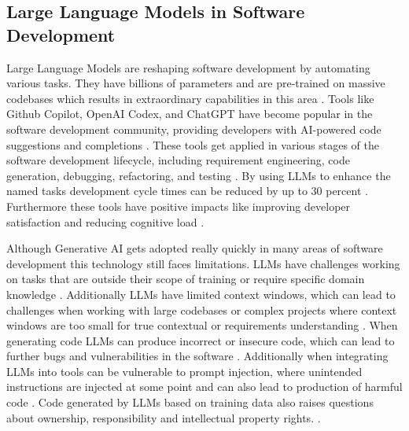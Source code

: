 \subsection{Large Language Models in Software Development}
Large Language Models are reshaping software development by automating various tasks. They have billions of parameters and are pre-trained on massive codebases which results in extraordinary capabilities in this area \cite{chenUnveilingPitfallsUnderstanding2025}. Tools like Github Copilot, OpenAI Codex, and ChatGPT have become popular in the software development community, providing developers with AI-powered code suggestions and completions \cite{bhargavmallampatiRoleGenerativeAI2025}. These tools get applied in various stages of the software development lifecycle, including requirement engineering, code generation, debugging, refactoring, and testing \cite{houLargeLanguageModels2024, puvvadiCodingAgentsComprehensive2025,bhargavmallampatiRoleGenerativeAI2025}. By using LLMs to enhance the named tasks development cycle times can be reduced by up to 30 percent \cite{bhargavmallampatiRoleGenerativeAI2025,kalliamvakouResearchQuantifyingGitHub2022}. Furthermore these tools have positive impacts like improving developer satisfaction and reducing cognitive load \cite{kalliamvakouResearchQuantifyingGitHub2022}.

Although Generative AI gets adopted really quickly in many areas of software development this technology still faces limitations. LLMs have challenges working on tasks that are outside their scope of training or require specific domain knowledge \cite{houLargeLanguageModels2024}. Additionally LLMs have limited context windows, which can lead to challenges when working with large codebases or complex projects where context windows are too small for true contextual or requirements understanding \cite{bhargavmallampatiRoleGenerativeAI2025}. When generating code LLMs can produce incorrect or insecure code, which can lead to further bugs and vulnerabilities in the software \cite{houLargeLanguageModels2024, bhargavmallampatiRoleGenerativeAI2025}. Additionally when integrating LLMs into tools can be vulnerable to prompt injection, where unintended instructions are injected at some point and can also lead to production of harmful code \cite{liuPromptInjectionAttack2024}. Code generated by LLMs based on training data also raises questions about ownership, responsibility and intellectual property rights. \cite{sauvolaFutureSoftwareDevelopment2024, houLargeLanguageModels2024}.

